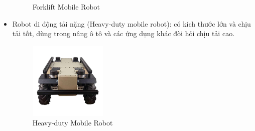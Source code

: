 \begin{itemize}
\begin{figure}[H]
                \caption{Forklift Mobile Robot}
                \label{chap1_pic3}
            \end{figure}
        \item Robot di động tải nặng (Heavy-duty mobile robot): có kích thước lớn và chịu tải tốt, dùng trong nâng ô tô và các ứng dụng khác đòi hỏi chịu tải cao.
            \begin{figure}[H]
                \centering
                \includegraphics[width=0.35\textwidth]{pictures/chapter1/chapter1_pic_4.png}
                \caption{Heavy-duty Mobile Robot}
                \label{chap1_pic4}
            \end{figure}
    \end{itemize}

